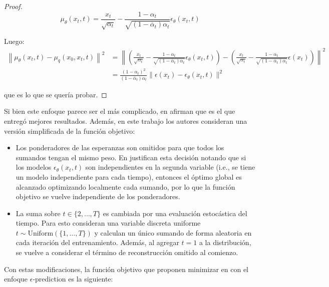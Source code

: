 \begin{proof}
    \begin{equation*}
        \mu_\theta(x_t,t) = \frac{x_t}{\sqrt{\alpha_t}} - \frac{1-\alpha_t}{\sqrt{(1-\overline{\alpha}_t)\alpha_t}}\epsilon_\theta(x_t,t)
    \end{equation*}

    Luego:
    \begin{align*}
        \left\| \mu_\theta(x_t,t) - \mu_q(x_0,x_t,t) \right\|^2 & = \left\| \left(\frac{x_t}{\sqrt{\alpha_t}} - \frac{1-\alpha_t}{\sqrt{(1-\overline{\alpha}_t)\alpha_t}}\epsilon_\theta(x_t,t)\right) - \left(\frac{x_t}{\sqrt{\alpha_t}} - \frac{1-\alpha_t}{\sqrt{(1-\overline{\alpha}_t)\alpha_t}}\epsilon(x_t)\right) \right\|^2 \\
                                                                & = \frac{(1-\alpha_t)^2}{(1-\bar\alpha_t)\alpha_t} \| \epsilon(x_t) - \epsilon_\theta(x_t,t) \|^2
    \end{align*}

    que es lo que se quería probar.
\end{proof}

Si bien este enfoque parece ser el más complicado, en \cite{ho2020denoising} afirman que es el que entregó mejores resultados. Además, en este trabajo los autores consideran una versión simplificada de la función objetivo:

\begin{itemize}
    \item Los ponderadores de las esperanzas son omitidos para que todos los sumandos tengan el mismo peso. En \cite{song2022denoising} justifican esta decisión notando que si los modelos $\epsilon_\theta(x_t,t)$ son independientes en la segunda variable (i.e., se tiene un modelo independiente para cada tiempo), entonces el óptimo global es alcanzado optimizando localmente cada sumando, por lo que la función objetivo se vuelve independiente de los ponderadores.
    \item La suma sobre $t\in\{2,\ldots,T\}$ es cambiada por una evaluación estocástica del tiempo. Para esto consideran una variable discreta uniforme $t\sim\text{Uniform}\left(\{1,\ldots,T\}\right)$ y calculan un único sumando de forma aleatoria en cada iteración del entrenamiento. Además, al agregar $t=1$ a la distribución, se vuelve a considerar el término de reconstrucción omitido al comienzo.
\end{itemize}

Con estas modificaciones, la función objetivo que proponen minimizar en \cite{ho2020denoising} con el enfoque $\epsilon$-prediction es la siguiente:

